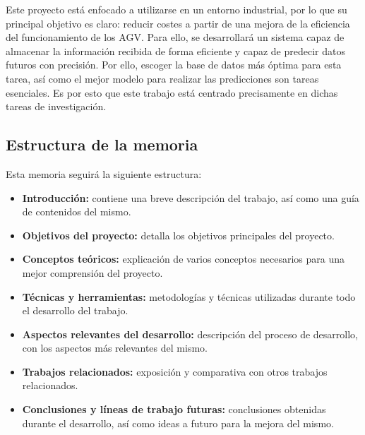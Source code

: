 Este proyecto está enfocado a utilizarse en un entorno industrial, por lo que su principal objetivo es claro:
reducir costes a partir de una mejora de la eficiencia del funcionamiento de los AGV. Para ello, se desarrollará 
un sistema capaz de almacenar la información recibida de forma eficiente y capaz de predecir datos futuros con 
precisión. Por ello, escoger la base de datos más óptima para esta tarea, así como el mejor modelo para realizar
las predicciones son tareas esenciales. Es por esto que este trabajo está centrado precisamente en dichas 
tareas de investigación.

\subsection{Estructura de la memoria}

Esta memoria seguirá la siguiente estructura:
\begin{itemize}
    \item \textbf{Introducción:} contiene una breve descripción del trabajo, así como una guía de contenidos del mismo.
    \item \textbf{Objetivos del proyecto:} detalla los objetivos principales del proyecto.
    \item \textbf{Conceptos teóricos:} explicación de varios conceptos necesarios para una mejor comprensión del
        proyecto.
    \item \textbf{Técnicas y herramientas:} metodologías y técnicas utilizadas durante todo el desarrollo del 
        trabajo.
    \item \textbf{Aspectos relevantes del desarrollo:} descripción del proceso de desarrollo, con los aspectos
        más relevantes del mismo.
    \item \textbf{Trabajos relacionados:} exposición y comparativa con otros trabajos relacionados.
    \item \textbf{Conclusiones y líneas de trabajo futuras:} conclusiones obtenidas durante el desarrollo, así
        como ideas a futuro para la mejora del mismo.
\end{itemize}

